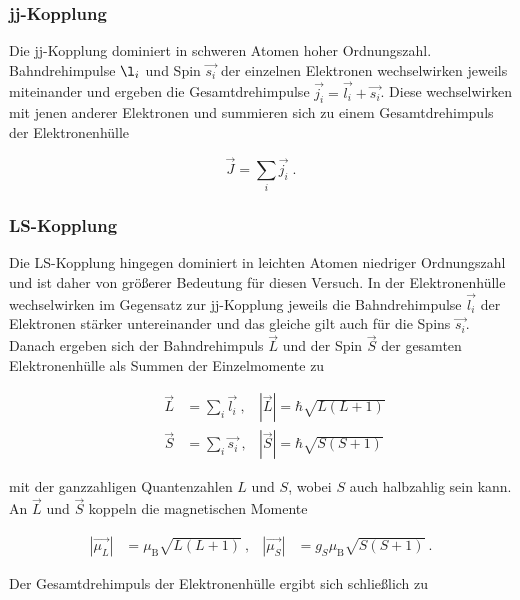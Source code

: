 \subsubsection{jj-Kopplung}

Die  jj-Kopplung dominiert in schweren Atomen hoher Ordnungszahl. 
Bahndrehimpulse $\l_i$ und Spin $\vec{s_i}$ der einzelnen Elektronen 
wechselwirken jeweils miteinander und ergeben die Gesamtdrehimpulse
 $\vec{j_i} = \vec{l_i} + \vec{s_i}$. Diese wechselwirken
 mit jenen anderer Elektronen und summieren sich zu einem
 Gesamtdrehimpuls der Elektronenhülle

\begin{equation}
    \vec{J} = \sum_i \vec{j_i} \; .
\end{equation}

\vspace{-20pt}
\subsubsection{LS-Kopplung}

Die LS-Kopplung hingegen dominiert in leichten Atomen niedriger Ordnungszahl
und ist daher von größerer Bedeutung für diesen Versuch.
In der Elektronenhülle wechselwirken im Gegensatz zur jj-Kopplung jeweils die Bahndrehimpulse $\vec{l_i}$
der Elektronen stärker untereinander und das gleiche gilt auch für die Spins $\vec{s_i}$.
Danach ergeben sich der Bahndrehimpuls $\vec{L}$ und der Spin $\vec{S}$
der gesamten Elektronenhülle als Summen der Einzelmomente zu

\begin{align}
    \qquad \vec{L} &= \sum_i \vec{l_i} \:, & |\vec{L}| = \hbar \sqrt{L(L+1)}\\
    \qquad \vec{S} &= \sum_i \vec{s_i} \:, & |\vec{S}| = \hbar \sqrt{S(S+1)}
\end{align}
\vspace{-10pt}

mit der ganzzahligen Quantenzahlen $L$ und $S$, wobei $S$ auch halbzahlig sein kann.  
An $\vec{L}$ und $\vec{S}$ koppeln die magnetischen Momente

\vspace{-15pt}
\begin{align}
 |\vec{\mu_L}|& = \mu_\text{B} \sqrt{L(L+1)} \:, &  |\vec{\mu_S}|& = g_S \mu_\text{B} \sqrt{S(S+1)}\: .
\end{align}

Der Gesamtdrehimpuls der Elektronenhülle ergibt sich schließlich zu

